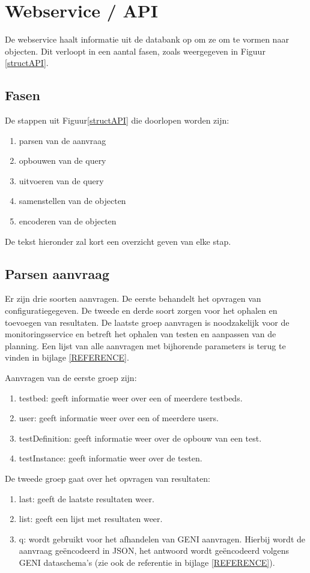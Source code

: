 \section{Webservice / API}
\npar
De webservice haalt informatie uit de databank op om ze om te vormen naar objecten. Dit verloopt in een aantal fasen, zoals weergegeven in Figuur \ref{structAPI}.
\clearpage
\subsection{Fasen}
\npar
De stappen uit Figuur\ref{structAPI} die doorlopen worden zijn:
\begin{enumerate}
\item parsen van de aanvraag
\item opbouwen van de query
\item uitvoeren van de query
\item samenstellen van de objecten
\item encoderen van de objecten
\end{enumerate}
De tekst hieronder zal kort een overzicht geven van elke stap.
\subsection{Parsen aanvraag}
\npar
Er zijn drie soorten aanvragen. De eerste behandelt het opvragen van configuratiegegeven. De tweede en derde soort zorgen voor het ophalen en toevoegen van resultaten. De laatste groep aanvragen is noodzakelijk voor de monitoringsservice en betreft het ophalen van testen en aanpassen van de planning. Een lijst van alle aanvragen met bijhorende parameters is terug te vinden in bijlage \ref{REFERENCE}.

\npar
Aanvragen van de eerste groep zijn:
\begin{enumerate}
\item testbed: geeft informatie weer over een of meerdere testbeds.
\item user: geeft informatie weer over een of meerdere users.
\item testDefinition: geeft informatie weer over de opbouw van een test.
\item testInstance: geeft informatie weer over de testen.
\end{enumerate}

De tweede groep gaat over het opvragen van resultaten:
\begin{enumerate}
\item last: geeft de laatste resultaten weer.
\item list: geeft een lijst met resultaten weer.
\item q: wordt gebruikt voor het afhandelen van GENI aanvragen. Hierbij wordt de aanvraag ge\"encodeerd in JSON, het antwoord wordt ge\"encodeerd volgens GENI dataschema's (zie ook de referentie in bijlage \ref{REFERENCE}).
\end{enumerate}

